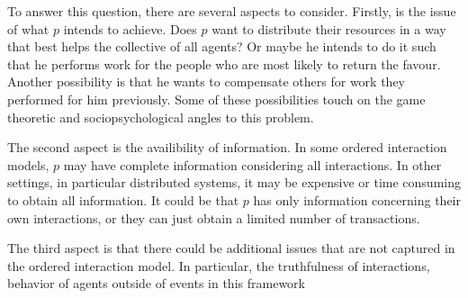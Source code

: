 \documentclass[a4paper,11pt]{book}
\theoremstyle{definition}
\begin{document}
To answer this question, there are several aspects to consider. Firstly, is the issue of
what $p$ intends to achieve. Does $p$ want to distribute their resources in a way that
best helps the collective of all agents? Or maybe he intends to do it such that
he performs work for the people who are most likely to return the favour. Another possibility
is that he wants to compensate others for work they performed for him previously.
Some of these possibilities touch on the game theoretic and sociopsychological angles to this problem.

The second aspect is the availibility of information. In some ordered interaction models, $p$ may
have complete information considering all interactions. In other settings, in particular distributed
systems, it may be expensive or time consuming to obtain all information. It could be that $p$ has only
information concerning their own interactions, or they can just obtain a limited number of transactions.

The third aspect is that there could be additional issues that are not captured in the ordered interaction
model. In particular, the truthfulness of interactions, behavior of agents outside of
events in this framework 












{}

\end{document}
